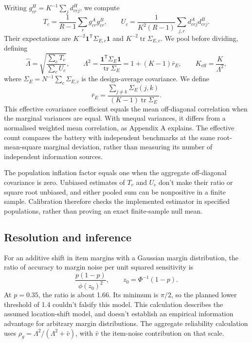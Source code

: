 \documentclass{article}
\newcommand{\Lam}{\Lambda}
\newcommand{\Sig}{\Sigma_E}
\begin{document}
Writing $g^H_{cr}=K^{-1}\sum_j d^H_{crj}$, we compute
\begin{equation}
T_c=\frac{1}{R-1}\sum_r g^A_{cr}g^B_{cr},\qquad
U_c=\frac{1}{K^2(R-1)}\sum_{j,r}d^A_{crj}d^B_{crj}.
\label{eq:tu}
\end{equation}
Their expectations are $K^{-2}\mathbf{1}^{\mathsf T}\Sigma_{E,c}\mathbf{1}$ and $K^{-2}\operatorname{tr}\Sigma_{E,c}$. We pool before dividing, defining
\begin{equation}
\widehat\Lam=\sqrt{\frac{\sum_c T_c}{\sum_c U_c}},\qquad
\Lam^2=\frac{\mathbf{1}^{\mathsf T}\Sig\mathbf{1}}{\operatorname{tr}\Sig}
=1+(K-1)\bar r_E,\qquad K_{\mathrm{eff}}=\frac{K}{\Lam^2},
\label{eq:lambda}
\end{equation}
where $\Sig=N^{-1}\sum_c\Sigma_{E,c}$ is the design-average covariance. We define
\begin{equation}
\bar r_E=\frac{\sum_{j\ne k}\Sigma_E(j,k)}{(K-1)\operatorname{tr}\Sig}.
\label{eq:effective}
\end{equation}
This effective covariance coefficient equals the mean off-diagonal correlation when the marginal variances are equal. With unequal variances, it differs from a normalised weighted mean correlation, as Appendix A explains. The effective count compares the battery with independent benchmarks at the same root-mean-square marginal deviation, rather than measuring its number of independent information sources.

The population inflation factor equals one when the aggregate off-diagonal covariance is zero. Unbiased estimates of $T_c$ and $U_c$ don't make their ratio or square root unbiased, and either pooled sum can be nonpositive in a finite sample. Calibration therefore checks the implemented estimator in specified populations, rather than proving an exact finite-sample null mean.

\subsection{Resolution and inference}
For an additive shift in item margins with a Gaussian margin distribution, the ratio of accuracy to margin noise per unit squared sensitivity is
\begin{equation}
\frac{p(1-p)}{\phi(z_0)^2},\qquad z_0=\Phi^{-1}(1-p).
\label{eq:information}
\end{equation}
At $p=0.35$, the ratio is about 1.66. Its minimum is $\pi/2$, so the planned lower threshold of 1.4 couldn't falsify this model. This calculation describes the assumed location-shift model, and doesn't establish an empirical information advantage for arbitrary margin distributions. The aggregate reliability calculation uses $\rho_g=\Lam^2/(\Lam^2+\bar v)$, with $\bar v$ the item-noise contribution on that scale.
\end{document}
